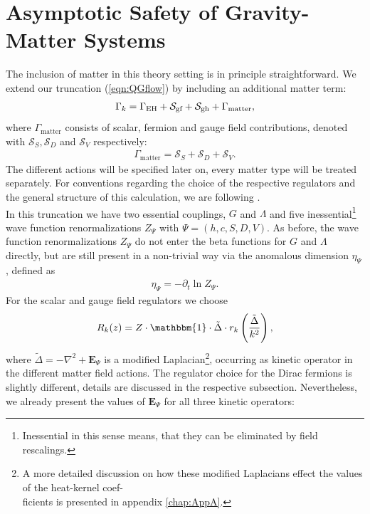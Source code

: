 \chapter{Asymptotic Safety of Gravity-Matter Systems}\label{chap:Matter}
The inclusion of matter in this theory setting is in principle straightforward. We extend our truncation (\ref{eqn:QGflow}) by including an additional matter term: 
\begin{align}
	\Gamma_{k} = \Gamma_{\text{EH}} + \mathcal{S}_{\text{gf}}+ \mathcal{S}_{\text{gh}}+ \Gamma_{\text{matter}},
\end{align}
where $\Gamma_{\mathrm{matter}}$ consists of scalar, fermion and gauge field contributions, denoted with $\mathcal{S}_S, \mathcal{S}_D$ and $\mathcal{S}_V$ respectively:
\begin{align}
	\Gamma_{\text{matter}} = \mathcal{S}_S + \mathcal{S}_D + \mathcal{S}_V.
\end{align}
The different actions will be specified later on, every matter type will be treated separately. For conventions regarding the choice of the respective regulators and the general structure of this calculation, we are following \cite{DonaEichhornPercacci2013}. \\
In this truncation we have two essential couplings, $G$ and $\Lambda$ and five inessential\footnote{Inessential in this sense means, that they can be eliminated by field rescalings.} wave function renormalizations $Z_{\Psi}$ with $\Psi = (h,c,S,D,V)$. As before, the wave function renormalizations $Z_{\Psi}$ do not enter the beta functions for $G$ and $\Lambda$ directly, but are still present in a non-trivial way via the anomalous dimension $\eta_{\Psi}$, defined as
\begin{align}
	\eta_{\Psi} = -\partial_t \ln Z_{\Psi}.
\end{align}
For the scalar and gauge field regulators we choose
\begin{align}
	R_{k}(z) = Z \cdot \mathbbm{1} \cdot \tilde{\Delta}\cdot r_k\left(\frac{\tilde{\Delta}}{k^2}\right),
	\label{eqn:Rk_matter}
\end{align}
where $\tilde{\Delta}= -\nabla^2 + \mathbf{E}_{\Psi}$ is a modified Laplacian\footnote{A more detailed discussion on how these modified Laplacians effect the values of the heat-kernel coef-\\ \phantom{........}ficients is presented in appendix \ref{chap:AppA}.}, occurring as kinetic operator in the different matter field actions. The regulator choice for the Dirac fermions is slightly different, details are discussed in the respective subsection. Nevertheless, we already present the values of $\mathbf{E}_{\Psi}$ for all three kinetic operators:
